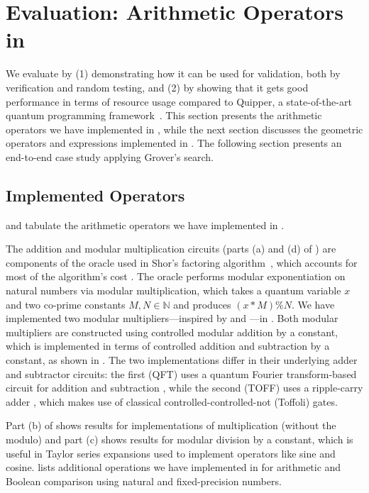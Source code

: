 \section{Evaluation: Arithmetic Operators in \oqasm}
\label{sec:arith-oqasm}

We evaluate \name by (1) demonstrating how it can be used for validation, both by verification and random testing, and (2) by showing that it gets good performance in terms of resource usage compared to Quipper, a state-of-the-art quantum programming framework~\cite{Green2013}.
%
This section presents the arithmetic operators we have implemented in
\oqasm, while the next section discusses the geometric operators and
expressions implemented in \vqimp. The following section presents an
end-to-end case study applying Grover's search.

\subsection{Implemented Operators}

 and  tabulate the
arithmetic operators we have implemented in \vqir. 

The addition and modular multiplication circuits 
(parts (a) and (d) of ) are components of the oracle used in Shor's factoring algorithm~\cite{shors}, which accounts for most of the algorithm's cost \cite{Gidney2021howtofactorbit}.
The oracle performs modular exponentiation on natural numbers via modular multiplication, which takes a quantum variable $x$ and two co-prime constants $M, N \in \mathbb{N}$ and produces $(x * M) \% N$. We have implemented two modular multipliers---inspired by \citet{qft-adder}
and \citet{ripple-carry-mod}---in \vqir. 
Both modular multipliers are constructed using controlled modular addition by a constant, which is implemented in terms of controlled addition and subtraction by a constant, as shown in .
The two implementations differ in their underlying adder and subtractor circuits: the first (QFT) uses a quantum Fourier transform-based circuit for addition and subtraction \cite{Draper2000AdditionOA}, while the second (TOFF) uses a ripple-carry adder \cite{ripple-carry-mod}, which makes use of classical controlled-controlled-not (Toffoli) gates.

Part (b) of  shows results for \oqasm implementations of multiplication (without the modulo) and part (c) shows results for modular division by a constant, which is useful in Taylor series expansions used to implement operators like sine and cosine.
 lists additional operations we have implemented in \vqir for arithmetic and Boolean comparison using natural and fixed-precision numbers.

